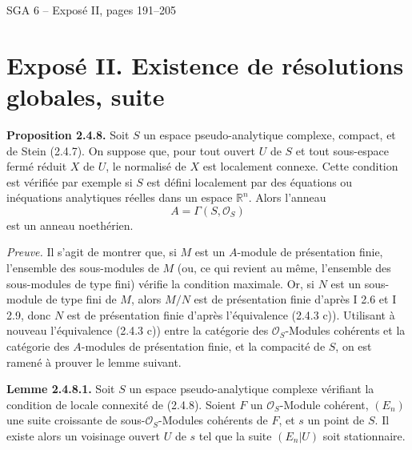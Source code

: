 \documentclass[11pt]{article}
\newcommand{\Spec}{\operatorname{Spec}}
\begin{document}
\providecommand{\D}{\mathrm D}
\providecommand{\Kcat}{\mathrm K}
\providecommand{\Qcoh}{\operatorname{Qcoh}}
\providecommand{\Mod}{\operatorname{Mod}}
\providecommand{\Coh}{\operatorname{Coh}}
\providecommand{\Lib}{\operatorname{Lib}}
\providecommand{\Loclib}{\operatorname{Loclib}}
\providecommand{\Hom}{\operatorname{Hom}}
\providecommand{\Ext}{\operatorname{Ext}}
\providecommand{\Ob}{\operatorname{ob}}
\providecommand{\Spec}{\operatorname{Spec}}
\providecommand{\RHom}{\mathrm R\!\operatorname{Hom}}
\providecommand{\ilim}{\varinjlim}
\providecommand{\plim}{\varprojlim}
\providecommand{\qcoh}{\mathrm{qcoh}}
\providecommand{\Id}{\operatorname{Id}}
\begin{center}\Large SGA 6 -- Exposé II, pages 191--205\end{center}


\section*{Exposé II. Existence de résolutions globales, suite}

\textbf{Proposition 2.4.8.} Soit $S$ un espace pseudo-analytique complexe, compact, et de Stein (2.4.7). On suppose que, pour tout ouvert $U$ de $S$ et tout sous-espace fermé réduit $X$ de $U$, le normalisé de $X$ est localement connexe. Cette condition est vérifiée par exemple si $S$ est défini localement par des équations ou inéquations analytiques réelles dans un espace $\mathbb R^n$. Alors l'anneau
\[
A=\Gamma(S,\mathcal O_S)
\]
est un anneau noethérien.

\emph{Preuve.} Il s'agit de montrer que, si $M$ est un $A$-module de présentation finie, l'ensemble des sous-modules de $M$ (ou, ce qui revient au même, l'ensemble des sous-modules de type fini) vérifie la condition maximale. Or, si $N$ est un sous-module de type fini de $M$, alors $M/N$ est de présentation finie d'après I 2.6 et I 2.9, donc $N$ est de présentation finie d'après l'équivalence (2.4.3 c)). Utilisant à nouveau l'équivalence (2.4.3 c)) entre la catégorie des $\mathcal O_S$-Modules cohérents et la catégorie des $A$-modules de présentation finie, et la compacité de $S$, on est ramené à prouver le lemme suivant.

\textbf{Lemme 2.4.8.1.} Soit $S$ un espace pseudo-analytique complexe vérifiant la condition de locale connexité de (2.4.8). Soient $F$ un $\mathcal O_S$-Module cohérent, $(E_n)$ une suite croissante de sous-$\mathcal O_S$-Modules cohérents de $F$, et $s$ un point de $S$. Il existe alors un voisinage ouvert $U$ de $s$ tel que la suite $(E_n|U)$ soit stationnaire.
\end{document}
